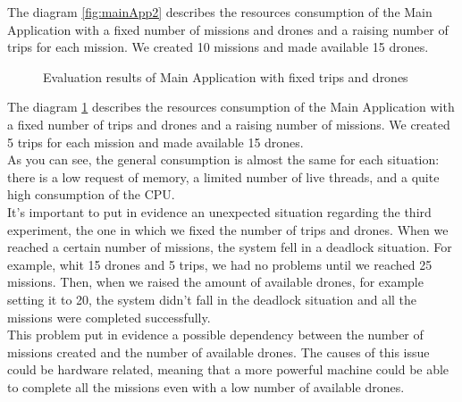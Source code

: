 The diagram \ref{fig:mainApp2} describes the resources consumption of the Main Application with a fixed number of missions and drones and a raising number of trips for each mission. We created 10 missions and made available 15 drones.
\newpage

\begin{figure}[h!]
\centering
  \caption{Evaluation results of Main Application with fixed trips and drones}
  \label{fig:mainApp3}
\end{figure}

The diagram \ref{fig:mainApp3} describes the resources consumption of the Main Application with a fixed number of trips and drones and a raising number of missions. We created 5 trips for each mission and made available 15 drones.
\\

As you can see, the general consumption is almost the same for each situation: there is a low request of memory, a limited number of live threads, and a quite high consumption of the CPU.
\\

It's important to put in evidence an unexpected situation regarding the third experiment, the one in which we fixed the number of trips and drones.
When we reached a certain number of missions, the system fell in a deadlock situation.
For example, whit 15 drones and 5 trips, we had no problems until we reached 25 missions.
Then, when we raised the amount of available drones, for example setting it to 20, the system didn't fall in the deadlock situation and all the missions were completed successfully.
\\
This problem put in evidence a possible dependency between the number of missions created and the number of available drones.
The causes of this issue could be hardware related, meaning that a more powerful machine could be able to complete all the missions even with a low number of available drones.